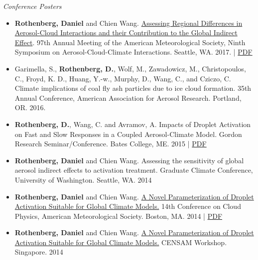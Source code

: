 \documentclass[11pt,letterpaper]{article}
\begin{document}
\bigskip
\emph{Conference Posters}
\medskip
\begin{itemize}[itemindent=-10pt]

 \item \textbf{Rothenberg, Daniel} and Chien Wang. \href{https://app.core-apps.com/ams2017/abstract/15b6ce6f2a9ba4be8e489d83ea69e909}{Assessing Regional Differences in Aerosol-Cloud Interactions and their Contribution to the Global Indirect Effect}. 97th Annual Meeting of the American Meteorological Society, Ninth Symposium on Aerosol-Cloud-Climate Interactions. Seattle, WA. 2017. | \href{https://figshare.com/s/f7bef67cb5d120e17a96}{PDF}

 \item Garimella, S., \textbf{Rothenberg, D.}, Wolf, M., Zawadowicz, M., Christopoulos, C., Froyd, K. D., Huang, Y.-w., Murphy, D., Wang, C., and Cziczo, C. Climate implications of coal fly ash particles due to ice cloud formation. 35th Annual Conference, American Association for Aerosol Research. Portland, OR. 2016.

 \item \textbf{Rothenberg, D.}, Wang, C. and Avramov, A. Impacts of Droplet Activation on Fast and Slow Responses in a Coupled Aerosol-Climate Model. Gordon Research Seminar/Conference. Bates College, ME. 2015 | \href{http://figshare.com/articles/poster_pdf/1534717}{PDF}

 \item \textbf{Rothenberg, Daniel} and Chien Wang. Assessing the sensitivity of global aerosol indirect effects to activation treatment. Graduate Climate Conference, University of Washington. Seattle, WA. 2014

 \item \textbf{Rothenberg, Daniel} and Chien Wang. \href{https://ams.confex.com/ams/14CLOUD14ATRAD/webprogram/Paper250349.html}{A Novel Parameterization of Droplet Activation Suitable for Global Climate Models.} 14th Conference on Cloud Physics, American Meteorological Society. Boston, MA. 2014 |  \href{http://figshare.com/articles/A_Novel_Parameterization_of_Droplet_Activation_Suitable_for_Global_Climate_Models/1085984}{PDF}

 \item \textbf{Rothenberg, Daniel} and Chien Wang. \href{http://figshare.com/articles/A_Novel_Parameterization_of_Droplet_Activation_Suitable_for_Global_Climate_Models/1085984}{A Novel Parameterization of Droplet Activation Suitable for Global Climate Models.} CENSAM Workshop. Singapore. 2014


\end{itemize}
\end{document}
